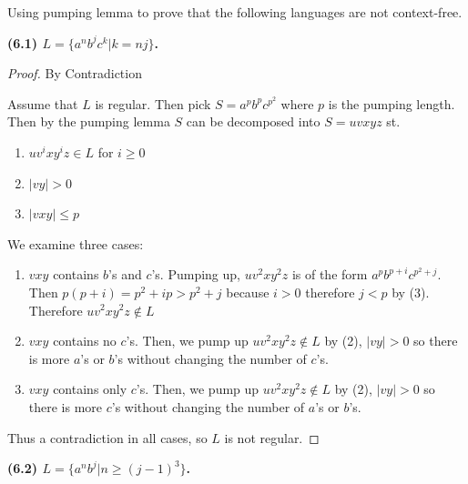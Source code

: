 \documentclass[11pt]{article}
\begin{document}
\noindent
Using pumping lemma to prove that the following languages are not
context-free.

\textbf{(6.1) $L=\{a^nb^jc^k|k=nj\}$.}
\newline

\begin{proof} By Contradiction

Assume that $L$ is regular. Then pick $S = a^p b^p c^{p^2}$ where $p$ is the pumping length. Then by the pumping lemma $S$ can be decomposed into $S = uvxyz$ st.

\begin{enumerate}[(1)]

 \item $uv^ixy^iz \in L$ for $i \geq 0$
 \item $|vy| > 0$
 \item $|vxy| \leq p$

\end{enumerate}

We examine three cases:
\begin{enumerate}
	\item $vxy$ contains $b$'s and $c$'s. Pumping up, $uv^2xy^2z$ is of the form $a^p b^{p + i} c^{p^2 + j}$. Then $p(p+i) = p^2 + ip > p^2 + j$ because $i > 0$ therefore $j < p$ by (3). Therefore $uv^2 x y^2 z \notin L$
	\item $vxy$ contains no $c$'s. Then, we pump up $uv^2 x y^2 z \notin L$ by (2), $|vy| > 0$ so there is more $a$'s or $b$'s without changing the number of $c$'s. 
	\item $vxy$ contains only $c$'s. Then, we pump up $uv^2 x y^2 z \notin L$ by (2), $|vy| > 0$ so there is more $c$'s without changing the number of $a$'s or $b$'s.

\end{enumerate}

Thus a contradiction in all cases, so $L$ is not regular.

\end{proof}






\textbf{(6.2) $L=\{a^nb^j|n\geq (j-1)^3\}$.}
\newline
\end{document}
